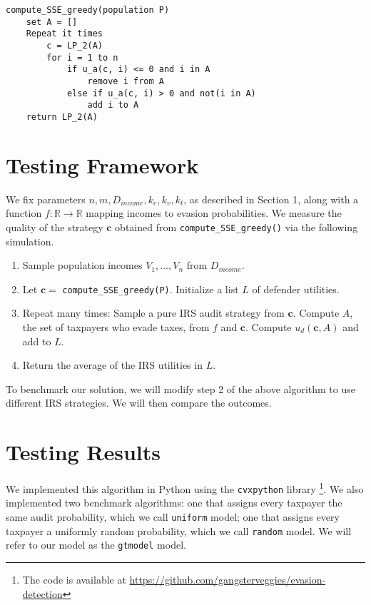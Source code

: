 \documentclass[paper=letter, fontsize=11pt]{article}
\begin{document}
\begin{verbatim}
compute_SSE_greedy(population P)
    set A = []
    Repeat it times
        c = LP_2(A)
        for i = 1 to n
            if u_a(c, i) <= 0 and i in A
                remove i from A
            else if u_a(c, i) > 0 and not(i in A)
                add i to A
    return LP_2(A)
\end{verbatim}

\section*{Testing Framework}
We fix parameters $n, m, D_{income}, k_e, k_v, k_t$, as described in
Section 1, along with a function $f : \mathbb{R} \to \mathbb{R}$
mapping incomes to evasion probabilities. We measure the quality of
the strategy $\bm{c}$ obtained from \verb|compute_SSE_greedy()| via
the following simulation.

\begin{enumerate}
\item Sample population incomes $V_1, \ldots, V_n$ from $D_{income}$.
\item Let $\bm{c} =$ \verb|compute_SSE_greedy(P)|. Initialize a list $L$ of defender utilities.
\item Repeat many times:
\subitem Sample a pure IRS audit strategy from $\bm{c}$.
\subitem Compute $A$, the set of taxpayers who evade taxes, from $f$ and $\bm{c}$.
\subitem Compute $u_d(\bm{c}, A)$ and add to $L$.
\item Return the average of the IRS utilities in $L$.
\end{enumerate}

To benchmark our solution, we will modify step 2 of the above
algorithm to use different IRS strategies. We will then compare the
outcomes.

\section*{Testing Results}

We implemented this algorithm in Python using the \texttt{cvxpython}
library \footnote{The code is available at
  \url{https://github.com/gangsterveggies/evasion-detection}}. We also
implemented two benchmark algorithms: one that assigns every taxpayer
the same audit probability, which we call \texttt{uniform} model; one
that assigns every taxpayer a uniformly random probability, which we
call \texttt{random} model. We will refer to our model as the
\texttt{gtmodel} model.
\end{document}
